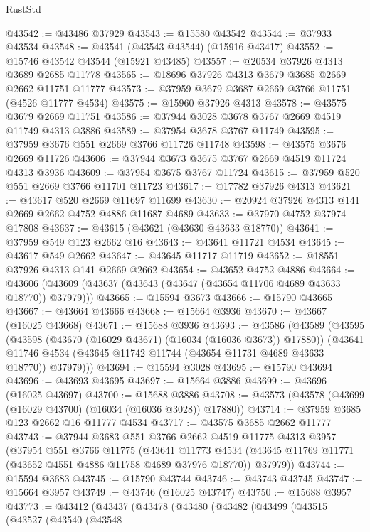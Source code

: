 \begin{lexlean}{RustStd}
\begin{coremodule}
@43542 := @43486 @37929
@43543 := @15580 @43542
@43544 := @37933 @43534
@43548 := @43541 (@43543 @43544) (@15916 @43417)
@43552 := @15746 @43542 @43544 (@15921 @43485)
@43557 := @20534 @37926 @4313 @3689 @2685 @11778
@43565 := @18696 @37926 @4313 @3679 @3685 @2669 @2662 @11751 @11777
@43573 := @37959 @3679 @3687 @2669 @3766 @11751 (@4526 @11777 @4534)
@43575 := @15960 @37926 @4313
@43578 := @43575 @3679 @2669 @11751
@43586 := @37944 @3028 @3678 @3767 @2669 @4519 @11749 @4313 @3886
@43589 := @37954 @3678 @3767 @11749
@43595 := @37959 @3676 @551 @2669 @3766 @11726 @11748
@43598 := @43575 @3676 @2669 @11726
@43606 := @37944 @3673 @3675 @3767 @2669 @4519 @11724 @4313 @3936
@43609 := @37954 @3675 @3767 @11724
@43615 := @37959 @520 @551 @2669 @3766 @11701 @11723
@43617 := @17782 @37926 @4313
@43621 := @43617 @520 @2669 @11697 @11699
@43630 := @20924 @37926 @4313 @141 @2669 @2662 @4752 @4886 @11687 @4689
@43633 := @37970 @4752 @37974 @17808
@43637 := @43615 (@43621 (@43630 @43633 @18770))
@43641 := @37959 @549 @123 @2662 @16
@43643 := @43641 @11721 @4534
@43645 := @43617 @549 @2662
@43647 := @43645 @11717 @11719
@43652 := @18551 @37926 @4313 @141 @2669 @2662
@43654 := @43652 @4752 @4886
@43664 := @43606 (@43609 (@43637 (@43643 (@43647 (@43654 @11706 @4689 @43633 @18770)) @37979)))
@43665 := @15594 @3673
@43666 := @15790 @43665
@43667 := @43664 @43666
@43668 := @15664 @3936
@43670 := @43667 (@16025 @43668)
@43671 := @15688 @3936
@43693 := @43586
    (@43589
      (@43595
        (@43598 (@43670 (@16029 @43671) (@16034 (@16036 @3673)) @17880))
        (@43641 @11746 @4534 (@43645 @11742 @11744 (@43654 @11731 @4689 @43633 @18770)) @37979)))
@43694 := @15594 @3028
@43695 := @15790 @43694
@43696 := @43693 @43695
@43697 := @15664 @3886
@43699 := @43696 (@16025 @43697)
@43700 := @15688 @3886
@43708 := @43573 (@43578 (@43699 (@16029 @43700) (@16034 (@16036 @3028)) @17880))
@43714 := @37959 @3685 @123 @2662 @16 @11777 @4534
@43717 := @43575 @3685 @2662 @11777
@43743 := @37944
    @3683
    @551
    @3766
    @2662
    @4519
    @11775
    @4313
    @3957
    (@37954
      @551
      @3766
      @11775
      (@43641
        @11773
        @4534
        (@43645 @11769 @11771 (@43652 @4551 @4886 @11758 @4689 @37976 @18770))
        @37979))
@43744 := @15594 @3683
@43745 := @15790 @43744
@43746 := @43743 @43745
@43747 := @15664 @3957
@43749 := @43746 (@16025 @43747)
@43750 := @15688 @3957
@43773 := @43412
    (@43437
      (@43478
        (@43480
          (@43482
            (@43499
              (@43515
                (@43527
                  (@43540
                    (@43548

\end{coremodule}
\end{lexlean}
